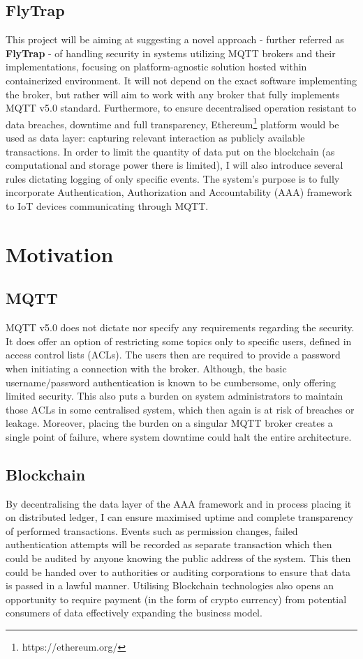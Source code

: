 \subsection{FlyTrap}
This project will be aiming at suggesting a novel approach - further referred as \textbf{FlyTrap} - of handling security in systems utilizing MQTT brokers and their implementations, focusing on platform-agnostic solution hosted within containerized environment. It will not depend on the exact software implementing the broker, but rather will aim to work with any broker that fully implements MQTT v5.0 standard. Furthermore, to ensure decentralised operation resistant to data breaches, downtime and full transparency, Ethereum\footnote{https://ethereum.org/} platform would be used as data layer: capturing relevant interaction as publicly available transactions. In order to limit the quantity of data put on the blockchain (as computational and storage power there is limited), I will also introduce several rules dictating logging of only specific events. The system's purpose is to fully incorporate Authentication, Authorization and Accountability (AAA) framework to IoT devices communicating through MQTT.

\section{Motivation}

\subsection{MQTT}
MQTT v5.0 does not dictate nor specify any requirements regarding the security. It does offer an option of restricting some topics only to specific users, defined in access control lists (ACLs). The users then are required to provide a password when initiating a connection with the broker. Although, the basic username/password authentication is known to be cumbersome, only offering limited security. This also puts a burden on system administrators to maintain those ACLs in some centralised system, which then again is at risk of breaches or leakage. Moreover, placing the burden on a singular MQTT broker creates a single point of failure, where system downtime could halt the entire architecture.
\subsection{Blockchain}
By decentralising the data layer of the AAA framework and in process placing it on distributed ledger, I can ensure maximised uptime and complete transparency of performed transactions. Events such as permission changes, failed authentication attempts will be recorded as separate transaction which then could be audited by anyone knowing the public address of the system. This then could be handed over to authorities or auditing corporations to ensure that data is passed in a lawful manner. Utilising Blockchain technologies also opens an opportunity to require payment (in the form of crypto currency) from potential consumers of data effectively expanding the business model. 
